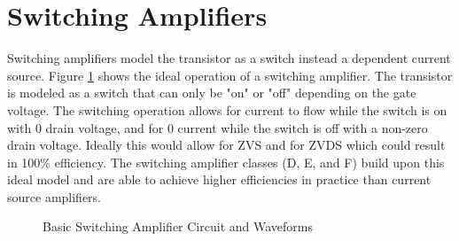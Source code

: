 \section{Switching Amplifiers}

Switching amplifiers model the transistor as a switch instead a dependent current source. Figure \ref{fig:basic_switch} shows the ideal operation of a switching amplifier. The transistor is modeled as a switch that can only be "on" or "off" depending on the gate voltage. The switching operation allows for current to flow while the switch is on with 0 drain voltage, and for 0 current while the switch is off with a non-zero drain voltage. Ideally this would allow for ZVS and for ZVDS which could result in 100\% efficiency. The switching amplifier classes (D, E, and F) build upon this ideal model and are able to achieve higher efficiencies in practice than current source amplifiers.

\begin{figure}
    \caption{Basic Switching Amplifier Circuit and Waveforms\cite{C.Cripps2006}}\label{fig:basic_switch}
\end{figure}

